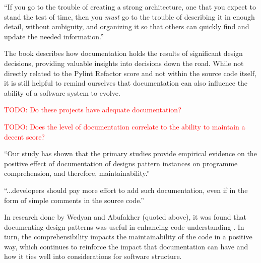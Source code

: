 \documentclass[12pt,conference]{IEEEtran}
\newcommand\todo[1]{\textcolor{red}{#1}}
\begin{document}
\vspace{0.25cm}

\begin{displayquote}
``If you go to the trouble of creating a strong architecture, one that you expect to stand the test of time, then you \textit{must} go to the trouble of describing it in enough detail, without ambiguity, and organizing it so that others can quickly find and update the needed information.''
\end{displayquote}

\vspace{0.25cm}

The book describes how documentation holds the results of significant design decisions, providing valuable insights into decisions down the road. While not directly related to the Pylint Refactor score and not within the source code itself, it is still helpful to remind ourselves that documentation can also influence the ability of a software system to evolve.

\todo{TODO: Do these projects have adequate documentation?}

\todo{TODO: Does the level of documentation correlate to the ability to maintain a decent score?}

\vspace{0.25cm}

\begin{displayquote}
``Our study has shown that the primary studies provide empirical evidence on the positive effect of documentation of designs pattern instances on programme comprehension, and therefore, maintainability.''
\end{displayquote}

\begin{displayquote}
``...developers should pay more effort to add such documentation, even if in the form of simple comments in the source code.''
\end{displayquote}

\vspace{0.25cm}

In research done by Wedyan and Abufakher (quoted above), it was found that documenting design patterns was useful in enhancing code understanding \cite{wedyan:2020}. In turn, the comprehensibility impacts the maintainability of the code in a positive way, which continues to reinforce the impact that documentation can have and how it ties well into considerations for software structure.

\end{document}
